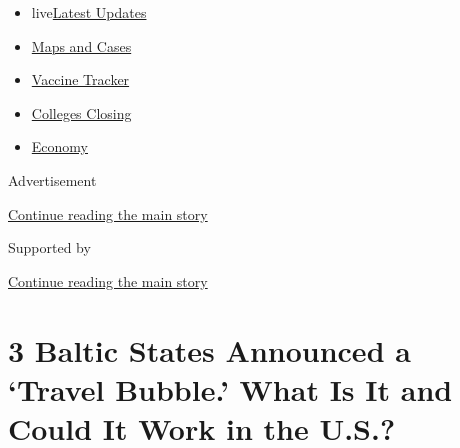 \begin{itemize}
\tightlist
\item
  live\href{https://www.nytimes3xbfgragh.onion/2020/08/20/world/coronavirus-covid.html?name=styln-coronavirus-national\&region=TOP_BANNER\&variant=undefined\&block=storyline_menu_recirc\&action=click\&pgtype=Article\&impression_id=d5b12901-e38e-11ea-bbe8-bf70f691015a}{Latest
  Updates}
\item
  \href{https://www.nytimes3xbfgragh.onion/interactive/2020/us/coronavirus-us-cases.html?name=styln-coronavirus-national\&region=TOP_BANNER\&variant=undefined\&block=storyline_menu_recirc\&action=click\&pgtype=Article\&impression_id=d5b12902-e38e-11ea-bbe8-bf70f691015a}{Maps
  and Cases}
\item
  \href{https://www.nytimes3xbfgragh.onion/interactive/2020/science/coronavirus-vaccine-tracker.html?name=styln-coronavirus-national\&region=TOP_BANNER\&variant=undefined\&block=storyline_menu_recirc\&action=click\&pgtype=Article\&impression_id=d5b12903-e38e-11ea-bbe8-bf70f691015a}{Vaccine
  Tracker}
\item
  \href{https://www.nytimes3xbfgragh.onion/2020/08/19/us/colleges-closing-covid.html?name=styln-coronavirus-national\&region=TOP_BANNER\&variant=undefined\&block=storyline_menu_recirc\&action=click\&pgtype=Article\&impression_id=d5b12904-e38e-11ea-bbe8-bf70f691015a}{Colleges
  Closing}
\item
  \href{https://www.nytimes3xbfgragh.onion/live/2020/08/20/business/stock-market-today-coronavirus?name=styln-coronavirus-national\&region=TOP_BANNER\&variant=undefined\&block=storyline_menu_recirc\&action=click\&pgtype=Article\&impression_id=d5b12905-e38e-11ea-bbe8-bf70f691015a}{Economy}
\end{itemize}

Advertisement

\protect\hyperlink{after-top}{Continue reading the main story}

Supported by

\protect\hyperlink{after-sponsor}{Continue reading the main story}

\hypertarget{3-baltic-states-announced-a-travel-bubble-what-is-it-and-could-it-work-in-the-us}{%
\section{3 Baltic States Announced a `Travel Bubble.' What Is It and
Could It Work in the
U.S.?}\label{3-baltic-states-announced-a-travel-bubble-what-is-it-and-could-it-work-in-the-us}}

